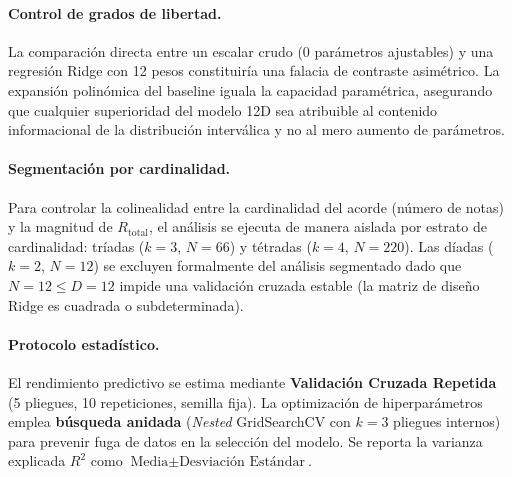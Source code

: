 \paragraph{Control de grados de libertad.}
La comparación directa entre un escalar crudo (0 parámetros ajustables) y una regresión Ridge con 12 pesos constituiría una falacia de contraste asimétrico. La expansión polinómica del baseline iguala la capacidad paramétrica, asegurando que cualquier superioridad del modelo 12D sea atribuible al contenido informacional de la distribución interválica y no al mero aumento de parámetros.

\paragraph{Segmentación por cardinalidad.}
Para controlar la colinealidad entre la cardinalidad del acorde (número de notas) y la magnitud de $R_{\text{total}}$, el análisis se ejecuta de manera aislada por estrato de cardinalidad: tríadas ($k=3$, $N=66$) y tétradas ($k=4$, $N=220$). Las díadas ($k=2$, $N=12$) se excluyen formalmente del análisis segmentado dado que $N=12 \leq D=12$ impide una validación cruzada estable (la matriz de diseño Ridge es cuadrada o subdeterminada).

\paragraph{Protocolo estadístico.}
El rendimiento predictivo se estima mediante \textbf{Validación Cruzada Repetida} (5 pliegues, 10 repeticiones, semilla fija). La optimización de hiperparámetros emplea \textbf{búsqueda anidada} (\textit{Nested} GridSearchCV con $k=3$ pliegues internos) para prevenir fuga de datos en la selección del modelo. Se reporta la varianza explicada $R^2$ como $\text{Media} \pm \text{Desviación Estándar}$.

